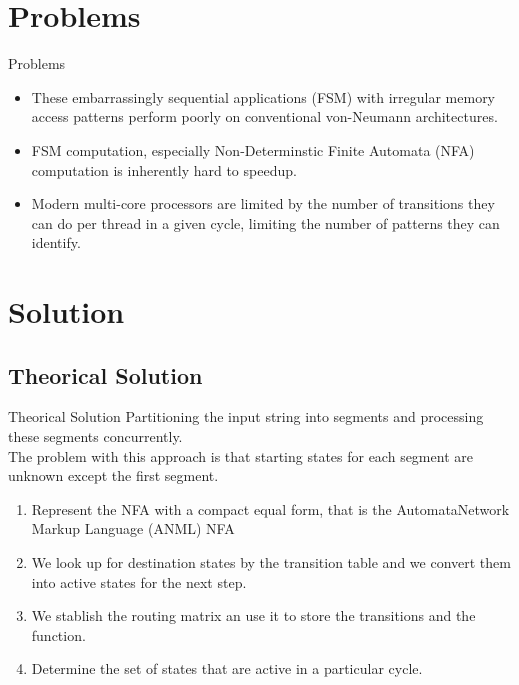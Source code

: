 \documentclass{beamer}
\begin{document}
  \section{Problems}

  \begin{frame}{Problems}
  \begin{itemize}
      \item These embarrassingly sequential
      applications (FSM) with irregular memory access patterns perform poorly
      on conventional von-Neumann architectures.
      \item FSM computation, especially Non-Determinstic Finite Automata
      (NFA) computation is inherently hard to speedup.
      \item Modern multi-core processors are limited by the number of transitions they can do
      per thread in a given cycle, limiting the number of patterns they can
      identify.
      
  \end{itemize}
  \end{frame}

  \section{Solution}
  \subsection{Theorical Solution}
  \begin{frame}[allowframebreaks]{Theorical Solution}
      Partitioning the input string into segments and processing these segments concurrently.\\
      The problem with this approach is that starting states
  for each segment are unknown except the first segment. 
  \begin{enumerate}
    \item Represent the NFA with a compact equal form, that is the  AutomataNetwork  Markup  Language (ANML) NFA
    \item We look up for destination states by the transition table and we convert them into active states for the next step.
    \item We stablish the routing matrix an use it to store the transitions and the function.
    \item Determine the set of states that are active in a particular cycle.
  \end{enumerate}        
    
  \end{frame}
\end{document}
